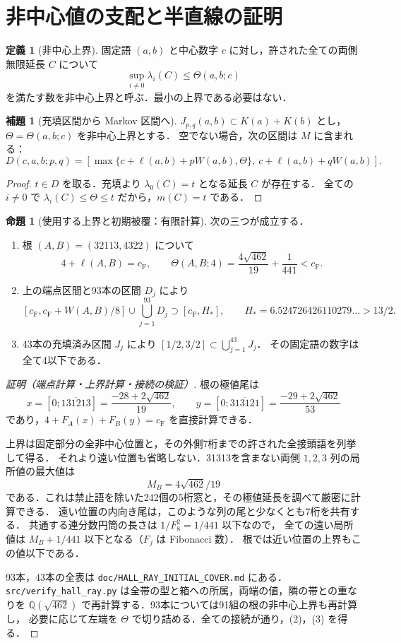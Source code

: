 \documentclass[10pt,a4paper]{article}
\theoremstyle{definition}
\newtheorem{definition}{定義}
\newtheorem{lemma}{補題}
\newtheorem{proposition}{命題}
\newcommand{\CF}{c_{\mathrm F}}
\newcommand{\file}[1]{{\small\nolinkurl{#1}}}
\begin{document}
\section{非中心値の支配と半直線の証明}\label{sec:ray}
\begin{definition}[非中心上界]
固定語 $(a,b)$ と中心数字 $c$ に対し，許された全ての両側無限延長 $C$ について
\[
 \sup_{i\ne0}\lambda_i(C)\le\Theta(a,b;c)
\]
を満たす数を非中心上界と呼ぶ．最小の上界である必要はない．
\end{definition}

\begin{lemma}[充填区間から Markov 区間へ]\label{lem:markov}
$J_{p,q}(a,b)\subset K(a)+K(b)$ とし，$\Theta=\Theta(a,b;c)$ を非中心上界とする．
空でない場合，次の区間は $M$ に含まれる：
\[
 D(c,a,b;p,q)=
 [\max\{c+\ell(a,b)+pW(a,b),\Theta\},\ c+\ell(a,b)+qW(a,b)].
\]
\end{lemma}
\begin{proof}
$t\in D$ を取る．充填より $\lambda_0(C)=t$ となる延長 $C$ が存在する．
全ての $i\ne0$ で $\lambda_i(C)\le\Theta\le t$ だから，$m(C)=t$ である．
\end{proof}

\begin{proposition}[使用する上界と初期被覆：有限計算]\label{prop:initial}
次の三つが成立する．
\begin{enumerate}
 \item 根 $(A,B)=(32113,4322)$ について
 \[
  4+\ell(A,B)=\CF,\qquad
  \Theta(A,B;4)=\frac{4\sqrt{462}}{19}+\frac1{441}<\CF.
 \]
 \item 上の端点区間と93本の区間 $D_j$ により
 \[
  [\CF,\CF+W(A,B)/8]\cup\bigcup_{j=1}^{93}D_j
       \supset[\CF,H_*],\qquad H_*=6.524726426110279\ldots>13/2.
 \]
 \item 43本の充填済み区間 $J_j$ により $[1/2,3/2]\subset\bigcup_{j=1}^{43}J_j$．
 その固定語の数字は全て4以下である．
\end{enumerate}
\end{proposition}
\begin{proof}[証明（端点計算・上界計算・接続の検証）]
根の極値尾は
\[
 x=[0;\overline{131213}]=\frac{-28+2\sqrt{462}}{19},\qquad
 y=[0;\overline{313121}]=\frac{-29+2\sqrt{462}}{53}
\]
であり，$4+F_A(x)+F_B(y)=\CF$ を直接計算できる．

上界は固定部分の全非中心位置と，その外側7桁までの許された全接頭語を列挙して得る．
それより遠い位置も省略しない．31313を含まない両側 $1,2,3$ 列の局所値の最大値は
\[
 M_B=4\sqrt{462}/19
\]
である．これは禁止語を除いた242個の5桁窓と，その極値延長を調べて厳密に計算できる．
遠い位置の内向き尾は，このような列の尾と少なくとも7桁を共有する．
共通する連分数円筒の長さは $1/F_8^2=1/441$ 以下なので，
全ての遠い局所値は $M_B+1/441$ 以下となる（$F_j$ は Fibonacci 数）．
根では近い位置の上界もこの値以下である．

93本，43本の全表は \file{doc/HALL_RAY_INITIAL_COVER.md} にある．
\file{src/verify_hall_ray.py} は全帯の型と箱への所属，両端の値，隣の帯との重なりを
$\mathbb Q(\sqrt{462})$ で再計算する．93本については91組の根の非中心上界も再計算し，
必要に応じて左端を $\Theta$ で切り詰める．全ての接続が通り，(2)，(3) を得る．
\end{proof}
\end{document}
